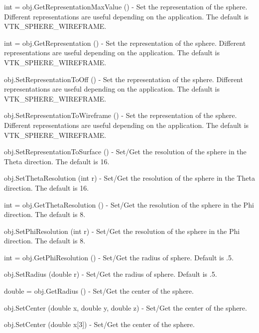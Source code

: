 \begin{DoxyItemize}
\item {\ttfamily int = obj.\-Get\-Representation\-Max\-Value ()} -\/ Set the representation of the sphere. Different representations are useful depending on the application. The default is V\-T\-K\-\_\-\-S\-P\-H\-E\-R\-E\-\_\-\-W\-I\-R\-E\-F\-R\-A\-M\-E.  
\item {\ttfamily int = obj.\-Get\-Representation ()} -\/ Set the representation of the sphere. Different representations are useful depending on the application. The default is V\-T\-K\-\_\-\-S\-P\-H\-E\-R\-E\-\_\-\-W\-I\-R\-E\-F\-R\-A\-M\-E.  
\item {\ttfamily obj.\-Set\-Representation\-To\-Off ()} -\/ Set the representation of the sphere. Different representations are useful depending on the application. The default is V\-T\-K\-\_\-\-S\-P\-H\-E\-R\-E\-\_\-\-W\-I\-R\-E\-F\-R\-A\-M\-E.  
\item {\ttfamily obj.\-Set\-Representation\-To\-Wireframe ()} -\/ Set the representation of the sphere. Different representations are useful depending on the application. The default is V\-T\-K\-\_\-\-S\-P\-H\-E\-R\-E\-\_\-\-W\-I\-R\-E\-F\-R\-A\-M\-E.  
\item {\ttfamily obj.\-Set\-Representation\-To\-Surface ()} -\/ Set/\-Get the resolution of the sphere in the Theta direction. The default is 16.  
\item {\ttfamily obj.\-Set\-Theta\-Resolution (int r)} -\/ Set/\-Get the resolution of the sphere in the Theta direction. The default is 16.  
\item {\ttfamily int = obj.\-Get\-Theta\-Resolution ()} -\/ Set/\-Get the resolution of the sphere in the Phi direction. The default is 8.  
\item {\ttfamily obj.\-Set\-Phi\-Resolution (int r)} -\/ Set/\-Get the resolution of the sphere in the Phi direction. The default is 8.  
\item {\ttfamily int = obj.\-Get\-Phi\-Resolution ()} -\/ Set/\-Get the radius of sphere. Default is .5.  
\item {\ttfamily obj.\-Set\-Radius (double r)} -\/ Set/\-Get the radius of sphere. Default is .5.  
\item {\ttfamily double = obj.\-Get\-Radius ()} -\/ Set/\-Get the center of the sphere.  
\item {\ttfamily obj.\-Set\-Center (double x, double y, double z)} -\/ Set/\-Get the center of the sphere.  
\item {\ttfamily obj.\-Set\-Center (double x\mbox{[}3\mbox{]})} -\/ Set/\-Get the center of the sphere.  

\end{DoxyItemize}
